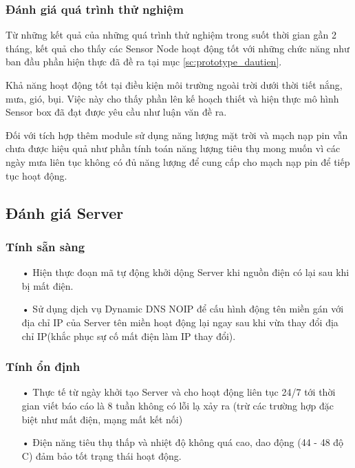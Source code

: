\subsubsection*{Đánh giá quá trình thử nghiệm}
Từ những kết quả của những quá trình thử nghiệm trong suốt thời gian gần 2 tháng, kết quả cho thấy các Sensor Node hoạt động tốt với những chức năng như ban đầu phần hiện thực đã đề ra tại mục \ref{sc:prototype_dautien}.

Khả năng hoạt động tốt tại điều kiện môi trường ngoài trời dưới thời tiết nắng, mưa, gió, bụi. Việc này cho thấy phần lên kế hoạch thiết và hiện thực mô hình Sensor box đã đạt được yêu cầu như luận văn đề ra.

Đối với tích hợp thêm module sử dụng năng lượng mặt trời và	mạch nạp pin vẫn chưa được hiệu quả như phần tính toán năng lượng tiêu thụ mong muốn vì các ngày mưa liên tục không có đủ năng lượng để cung cấp cho mạch nạp pin để tiếp tục hoạt động.

\subsection{Đánh giá Server}
\subsubsection*{Tính sẵn sàng}
\begin{itemize}
\item[•] Hiện thực đoạn mã tự động khởi dộng Server khi nguồn điện có lại sau khi bị mất điện.\
\item[•] Sử dụng dịch vụ Dynamic DNS NOIP để cấu hình động tên miền gán với địa chỉ IP của Server tên miền hoạt động lại ngay sau khi vừa thay đổi địa chỉ IP(khắc phục sự cố mất điện làm IP thay đổi).
\end{itemize}
\subsubsection*{Tính ổn định}
\begin{itemize}
	\item[•]Thực tế từ ngày khởi tạo Server và cho hoạt động liên tục 24/7 tới thời gian viết báo cáo là 8 tuần không có lỗi lạ xảy ra (trừ các trường hợp đặc biệt như mất điện, mạng mất kết nối)
	\item[•]Điện năng tiêu thụ thấp và nhiệt độ không quá cao, dao động (44 - 48 độ C) đảm bảo tốt trạng thái hoạt động.
\end{itemize}
